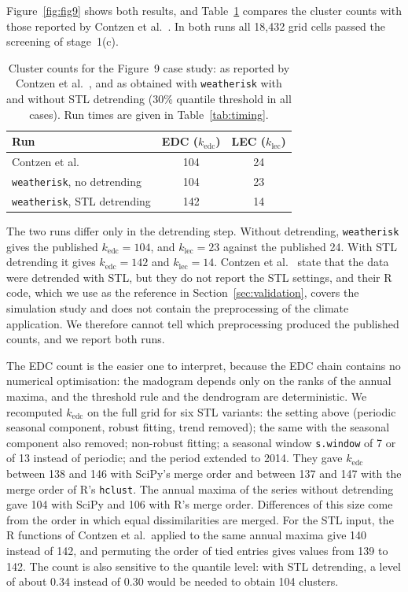 \documentclass[preprint,12pt,a4paper]{elsarticle}
\begin{document}
Figure~\ref{fig:fig9} shows both results, and
Table~\ref{tab:fig9-counts} compares the cluster counts with those
reported by Contzen et al.~\cite{contzen2025}. In both runs all
18{,}432 grid cells passed the screening of stage~1(c).

\begin{table}[ht]
\centering
\begin{tabular}{lcc}
\toprule
\textbf{Run} & \textbf{EDC ($k_{\text{edc}}$)} &
  \textbf{LEC ($k_{\text{lec}}$)} \\
\midrule
Contzen et al.~\cite{contzen2025} & 104 & 24 \\
\texttt{weatherisk}, no detrending & 104 & 23 \\
\texttt{weatherisk}, STL detrending & 142 & 14 \\
\bottomrule
\end{tabular}
\caption{Cluster counts for the Figure~9 case study: as reported by
  Contzen et al.~\cite{contzen2025}, and as obtained with
  \texttt{weatherisk} with and without STL detrending (30\% quantile
  threshold in all cases). Run times are given in
  Table~\ref{tab:timing}.}
\label{tab:fig9-counts}
\end{table}

The two runs differ only in the detrending step. Without
detrending, \texttt{weatherisk} gives the published
$k_{\text{edc}} = 104$, and $k_{\text{lec}} = 23$ against the
published 24. With STL detrending it gives $k_{\text{edc}} = 142$
and $k_{\text{lec}} = 14$. Contzen et al.~\cite{contzen2025} state
that the data were detrended with STL, but they do not report the
STL settings, and their R code, which we use as the reference in
Section~\ref{sec:validation}, covers the simulation study and does
not contain the preprocessing of the climate application. We
therefore cannot tell which
preprocessing produced the published counts, and we report both
runs.

The EDC count is the easier one to interpret, because the EDC chain
contains no numerical optimisation: the madogram depends only on the
ranks of the annual maxima, and the threshold rule and the
dendrogram are deterministic. We recomputed $k_{\text{edc}}$ on the
full grid for six STL variants: the setting above (periodic seasonal
component, robust fitting, trend removed); the same with the
seasonal component also removed; non-robust fitting; a seasonal
window \texttt{s.window} of 7 or of 13 instead of periodic; and the
period extended to 2014. They gave $k_{\text{edc}}$ between 138 and
146 with SciPy's merge order and between 137 and 147 with the merge
order of R's \texttt{hclust}. The annual maxima of the series without
detrending gave 104 with SciPy and 106 with R's merge order.
Differences of this size come from the order in which equal
dissimilarities are merged.
For the STL input, the R functions of Contzen et al.\ applied to the
same annual maxima give 140 instead of 142, and permuting the order
of tied entries gives values from 139 to 142. The count is also
sensitive to the quantile level: with STL detrending, a level of
about 0.34 instead of 0.30 would be needed to obtain 104 clusters.
\end{document}

